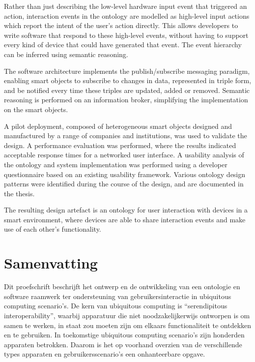 Rather than just describing the low-level hardware input event that triggered an action, interaction events in the ontology are modelled as high-level input actions which report the intent of the user's action directly. This allows developers to write software that respond to these high-level events, without having to support every kind of device that could have generated that event. The event hierarchy can be inferred using semantic reasoning.

The software architecture implements the publish/subscribe messaging paradigm, enabling smart objects to subscribe to changes in data, represented in triple form, and be notified every time these triples are updated, added or removed. Semantic reasoning is performed on an information broker, simplifying the implementation on the smart objects.

A pilot deployment, composed of heterogeneous smart objects designed and manufactured by a range of companies and institutions, was used to validate the design. A performance evaluation was performed, where the results indicated acceptable response times for a networked user interface. A usability analysis of the ontology and system implementation was performed using a developer questionnaire based on an existing usability framework. Various ontology design patterns were identified during the course of the design, and are documented in the thesis.

The resulting design artefact is an ontology for user interaction with devices in a smart environment, where devices are able to share interaction events and make use of each other's functionality.


\vfill

\chapter*{Samenvatting}

Dit proefschrift beschrijft het ontwerp en de ontwikkeling van een ontologie en software raamwerk ter ondersteuning van gebruikersinteractie in ubiquitous computing scenario's. De kern van ubiquitous computing is ``serendipitous interoperability'', waarbij apparatuur die niet noodzakelijkerwijs ontworpen is om samen te werken, in staat zou moeten zijn om elkaars functionaliteit te ontdekken en te gebruiken. In toekomstige ubiquitous computing scenario's zijn honderden apparaten betrokken. Daarom is het op voorhand overzien van de verschillende types apparaten en gebruikersscenario's een onhanteerbare opgave. 

